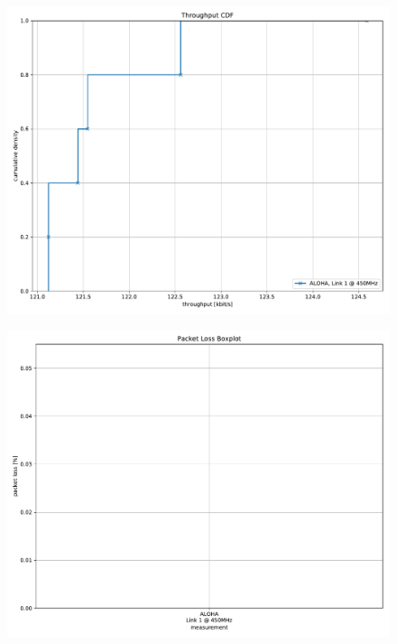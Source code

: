 \documentclass{article}
\begin{document}
\begin{figure}
	\includegraphics[width=\textwidth]{aloha_rb_high/cdf/throughput_cdf}
\end{figure}

\cleardoublepage

\begin{figure}
	\includegraphics[width=\textwidth]{aloha_rb_high/boxplot/packet_loss_boxplot}
\end{figure}
\end{document}
